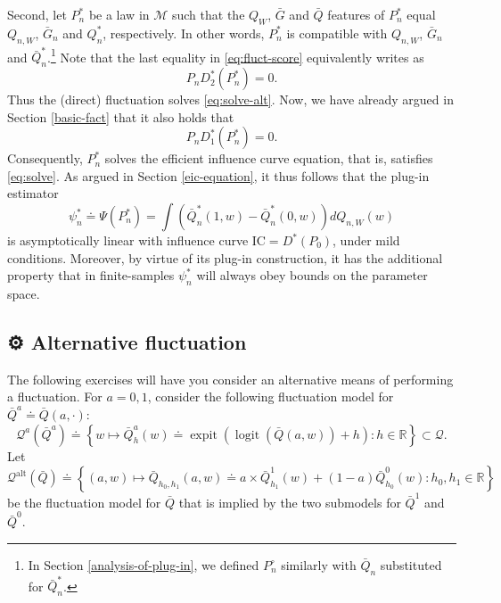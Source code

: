 \documentclass[11pt,openright,twoside]{book}
\DeclareMathOperator{\expit}{expit}
\DeclareMathOperator{\logit}{logit}
\newcommand{\gear}{\usebox{\gearbox}\;}
\newcommand{\bbR}{\mathbb{R}}
\newcommand{\defq}{\doteq}
\newcommand{\calM}{\mathcal{M}}
\newcommand{\calQ}{\mathcal{Q}}
\newcommand{\IC}{\textrm{IC}}
\newcommand{\Gbar}{\bar{G}}
\newcommand{\Phat}{P^{\circ}}
\newcommand{\Qbar}{\bar{Q}}
\theoremstyle{definition}
\theoremstyle{definition}
\theoremstyle{definition}
\theoremstyle{remark}
\begin{document}
Second, let \(P_{n}^{*}\) be a law in \(\calM\) such that the \(Q_{W}\), \(\Gbar\) and
\(\Qbar\) features of \(P_{n}^{*}\) equal \(Q_{n,W}\), \(\Gbar_{n}\) and \(Q_{n}^{*}\),
respectively. In other words, \(P_{n}^{*}\) is compatible with \(Q_{n,W}\),
\(\Gbar_{n}\) and \(\Qbar_{n}^{*}\).\footnote{In Section \ref{analysis-of-plug-in}, we
  defined \(\Phat_{n}\) similarly with \(\Qbar_{n}\) substituted for
  \(\Qbar_{n}^{*}\).} Note that the last equality in \eqref{eq:fluct-score}
equivalently writes as \begin{equation*}P_{n}  D_{2}^{*}   (P_{n}^{*})  =
0.\end{equation*} Thus the (direct) fluctuation solves
\eqref{eq:solve-alt}. Now, we have already argued in Section \ref{basic-fact}
that it also holds that \begin{equation*}P_{n}  D_{1}^{*}  (P_{n}^{*})  =
0.\end{equation*} Consequently, \(P_{n}^{*}\) solves the efficient influence
curve equation, that is, satisfies \eqref{eq:solve}. As argued in Section
\ref{eic-equation}, it thus follows that the plug-in estimator
\begin{equation*}     \psi_n^*    \defq     \Psi(P_{n}^{*})    =     \int
\left(\Qbar_n^*(1,w)  - \Qbar_n^*(0,w)\right)  dQ_{n,W}(w) \end{equation*} is
asymptotically linear with influence curve \(\IC = D^{*}(P_{0})\), under mild
conditions. Moreover, by virtue of its plug-in construction, it has the
additional property that in finite-samples \(\psi_n^*\) will always obey bounds
on the parameter space.

\hypertarget{exo-tmle-flucs}{%
\subsection{\texorpdfstring{⚙ \gear Alternative fluctuation}{⚙ Alternative fluctuation}}\label{exo-tmle-flucs}}

The following exercises will have you consider an alternative means of
performing a fluctuation. For \(a = 0, 1\), consider the following
fluctuation model for \(\Qbar^a \defq \Qbar(a,\cdot)\):
\begin{equation} 
\calQ^a(\Qbar^a)
\defq      \left\{w       \mapsto      \Qbar_{h}^a(w)      \defq
\expit\left(\logit\left(\Qbar(a,w)\right) +  h
\right) : h \in \bbR\right\} \subset \calQ. \label{eq:Q-fluct-alt} 
\end{equation}
Let
\begin{equation*}
  \calQ^{\text{alt}}(\Qbar)   \defq   \left\{(a,w)  \mapsto   \Qbar_{h_0,
  h_1}(a,w) \defq a \times
  \Qbar_{h_{1}}^1(w) + (1-a) \Qbar_{h_{0}}^0(w) : h_{0}, h_{1} \in \bbR\right\}
\end{equation*}
be the fluctuation model for \(\Qbar\) that is implied by the two submodels for
\(\Qbar^1\) and \(\Qbar^0\).
\end{document}
